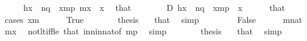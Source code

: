 \begin{isabellebody}
\isanewline
\ \ \isamarkupfalse%
\ \isamarkupfalse%
\ {}{\isacharcolon}{\kern0pt}{\isachardoublequoteopen}{\isacharquery}{\kern0pt}h{\isacharbackquote}{\kern0pt}x\ {\isasymin}\ n{\isacharhash}{\kern0pt}{\isacharplus}{\kern0pt}q{\isachardoublequoteclose}\ \ {\isachardoublequoteopen}x{\isasymin}m{\isacharhash}{\kern0pt}{\isacharplus}{\kern0pt}p{\isachardoublequoteclose}\ {\isachardoublequoteopen}m{\isasymle}x{\isachardoublequoteclose}\ \ x\ \isamarkupfalse%
\ that\ \isacommand{{\isachardot}{\kern0pt}}\isamarkupfalse%
\isanewline
\ \ \isamarkupfalse%
\isanewline
\ \ \ \ D{\isacharcolon}{\kern0pt}\ {\isachardoublequoteopen}{\isacharquery}{\kern0pt}h{\isacharbackquote}{\kern0pt}x\ {\isasymin}\ n{\isacharhash}{\kern0pt}{\isacharplus}{\kern0pt}q{\isachardoublequoteclose}\ \ {\isachardoublequoteopen}x{\isasymin}m{\isacharhash}{\kern0pt}{\isacharplus}{\kern0pt}p{\isachardoublequoteclose}\ \ x\isanewline
\ \ \ \ \isamarkupfalse%
\ that\isanewline
\ \ \isamarkupfalse%
\ {\isacharparenleft}{\kern0pt}cases\ {\isachardoublequoteopen}x{\isacharless}{\kern0pt}m{\isachardoublequoteclose}{\isacharparenright}{\kern0pt}\isanewline
\ \ \ \ \isamarkupfalse%
\ True\isanewline
\ \ \ \ \isamarkupfalse%
\ \isamarkupfalse%
\ {\isacharquery}{\kern0pt}thesis\ \isamarkupfalse%
\ {}\ that\ \isamarkupfalse%
\ simp\isanewline
\ \ \isamarkupfalse%
\isanewline
\ \ \ \ \isamarkupfalse%
\ False\isanewline
\ \ \ \ \isamarkupfalse%
\ {\isacartoucheopen}m{\isasymin}nat{\isacartoucheclose}\ \isamarkupfalse%
\ {\isachardoublequoteopen}m{\isasymle}x{\isachardoublequoteclose}\ \isamarkupfalse%
\ not{\isacharunderscore}{\kern0pt}lt{\isacharunderscore}{\kern0pt}iff{\isacharunderscore}{\kern0pt}le\ that\ in{\isacharunderscore}{\kern0pt}n{\isacharunderscore}{\kern0pt}in{\isacharunderscore}{\kern0pt}nat{\isacharbrackleft}{\kern0pt}of\ {\isachardoublequoteopen}m{\isacharhash}{\kern0pt}{\isacharplus}{\kern0pt}p{\isachardoublequoteclose}{\isacharbrackright}{\kern0pt}\ \isamarkupfalse%
\ simp\isanewline
\ \ \ \ \isamarkupfalse%
\ \isamarkupfalse%
\ {\isacharquery}{\kern0pt}thesis\ \isamarkupfalse%
\ {}\ that\ \isamarkupfalse%
\ simp\isanewline
\ \ \isamarkupfalse%

\end{isabellebody}
